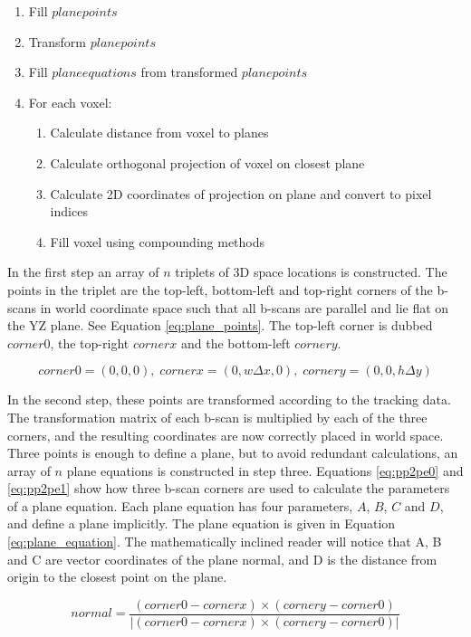 \begin{enumerate}
	\item Fill $planepoints$
	\item Transform $planepoints$
	\item Fill $planeequations$ from transformed $planepoints$
	\item For each voxel:
	\begin{enumerate}
		\item Calculate distance from voxel to planes
		\item Calculate orthogonal projection of voxel on closest plane
		\item Calculate 2D coordinates of projection on plane and convert to pixel indices
		\item Fill voxel using compounding methods
	\end{enumerate}
\end{enumerate}

In the first step an array of $n$ triplets of 3D space locations is constructed. The points in the triplet are the top-left, bottom-left and top-right corners of the b-scans in world coordinate space such that all b-scans are parallel and lie flat on the YZ plane. See Equation \ref{eq:plane_points}. The top-left corner is dubbed $corner0$, the top-right $cornerx$ and the bottom-left $cornery$.

\begin{equation}
\label{eq:plane_points}
	corner0 = (0,0,0), \; cornerx = (0,w\Delta x,0), \; cornery = (0,0,h\Delta y)
\end{equation}

In the second step, these points are transformed according to the tracking data. The transformation matrix of each b-scan is multiplied by each of the three corners, and the resulting coordinates are now correctly placed in world space. Three points is enough to define a plane, but to avoid redundant calculations, an array of $n$ plane equations is constructed in step three. Equations \ref{eq:pp2pe0} and \ref{eq:pp2pe1} show how three b-scan corners are used to calculate the parameters of a plane equation. Each plane equation has four parameters, $A$, $B$, $C$ and $D$, and define a plane implicitly. The plane equation is given in Equation \ref{eq:plane_equation}. The mathematically inclined reader will notice that A, B and C are vector coordinates of the plane normal, and D is the distance from origin to the closest point on the plane.

\begin{equation}
\label{eq:pp2pe0}
	normal = \frac{(corner0-cornerx) \times (cornery-corner0)}{|(corner0-cornerx) \times (cornery-corner0)|}
\end{equation}

